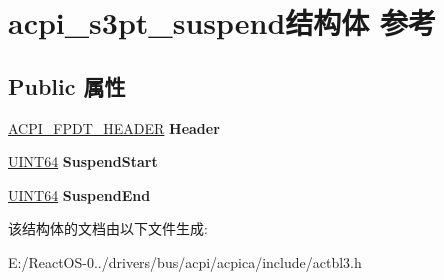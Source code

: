 \hypertarget{structacpi__s3pt__suspend}{}\section{acpi\+\_\+s3pt\+\_\+suspend结构体 参考}
\label{structacpi__s3pt__suspend}
\subsection*{Public 属性}
\begin{DoxyCompactItemize}
\item 
\mbox{\label{structacpi__s3pt__suspend_a22a2c832360e594f34f2238aed31cbfb}} 
\hyperlink{structacpi__fpdt__header}{A\+C\+P\+I\+\_\+\+F\+P\+D\+T\+\_\+\+H\+E\+A\+D\+ER} {\bfseries Header}
\item 
\mbox{\label{structacpi__s3pt__suspend_aba27710218e7b4ddf9879b28c2ca247f}} 
\hyperlink{_processor_bind_8h_a57be03562867144161c1bfee95ca8f7c}{U\+I\+N\+T64} {\bfseries Suspend\+Start}
\item 
\mbox{\label{structacpi__s3pt__suspend_a81bcee8c318665e96abf51fa153e9298}} 
\hyperlink{_processor_bind_8h_a57be03562867144161c1bfee95ca8f7c}{U\+I\+N\+T64} {\bfseries Suspend\+End}
\end{DoxyCompactItemize}


该结构体的文档由以下文件生成\+:\begin{DoxyCompactItemize}
\item 
E\+:/\+React\+O\+S-\/0../drivers/bus/acpi/acpica/include/actbl3.\+h\end{DoxyCompactItemize}
